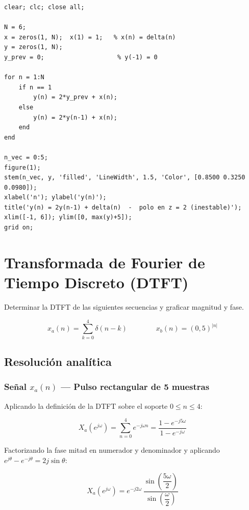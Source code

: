 \documentclass[../Main_Include.tex]{subfiles}
\begin{document}
\begin{lstlisting}[style=matlab_dark,
    caption={Ejercicio 3 --- Sistema recursivo inestable},
    label={lst:ej3}]
% ETN1015 - Ejercicio 3: Sistema recursivo inestable
clear; clc; close all;

N = 6;
x = zeros(1, N);  x(1) = 1;   % x(n) = delta(n)
y = zeros(1, N);
y_prev = 0;                    % y(-1) = 0

for n = 1:N
    if n == 1
        y(n) = 2*y_prev + x(n);
    else
        y(n) = 2*y(n-1) + x(n);
    end
end

n_vec = 0:5;
figure(1);
stem(n_vec, y, 'filled', 'LineWidth', 1.5, 'Color', [0.8500 0.3250 0.0980]);
xlabel('n'); ylabel('y(n)');
title('y(n) = 2y(n-1) + delta(n)  -  polo en z = 2 (inestable)');
xlim([-1, 6]); ylim([0, max(y)+5]);
grid on;
\end{lstlisting}

\newpage
\section{Transformada de Fourier de Tiempo Discreto (DTFT)}

Determinar la DTFT de las siguientes secuencias y graficar magnitud y fase.

\[
    x_a(n) = \sum_{k=0}^{4}\delta(n-k)
    \qquad\qquad
    x_b(n) = (0{,}5)^{|n|}
\]

\subsection*{Resolución analítica}

\subsubsection*{Señal $x_a(n)$ — Pulso rectangular de 5 muestras}

Aplicando la definición de la DTFT sobre el soporte $0 \le n \le 4$:

\[
    X_a(e^{j\omega}) = \sum_{n=0}^{4} e^{-j\omega n}
    = \frac{1 - e^{-j5\omega}}{1 - e^{-j\omega}}
\]

Factorizando la fase mitad en numerador y denominador y aplicando
$e^{j\theta} - e^{-j\theta} = 2j\sin\theta$:

\[
    \boxed{X_a(e^{j\omega}) = e^{-j2\omega}\,
    \frac{\sin\!\left(\dfrac{5\omega}{2}\right)}
         {\sin\!\left(\dfrac{\omega}{2}\right)}}
\]
\end{document}
